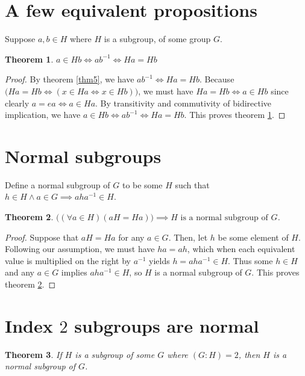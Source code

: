 \documentclass[12pt]{article}
\newtheorem{thm}{Theorem}
\begin{document}
\section{A few equivalent propositions}

Suppose $a,b \in H$
where $H$ is a subgroup,
of some group $G$.

\begin{thm} \label{thm11}
	$a \in Hb \iff ab^{-1} \iff Ha = Hb$
\end{thm}

\begin{proof}
	By theorem \ref{thm5},
	we have $ab^{-1} \iff Ha = Hb$.
	Because $\Big(Ha = Hb \iff (x \in Ha \iff x \in Hb)\Big)$,
	we must have $Ha = Hb \iff a \in Hb$
	since clearly $a = ea \iff a \in Ha$.
	By transitivity and commutivity of bidirective implication,
	we have $a \in Hb \iff ab^{-1} \iff Ha = Hb$.
	This proves theorem \ref{thm11}.
\end{proof}

\section{Normal subgroups}

Define a normal subgroup of $G$ to be some $H$
such that $h \in H \land a \in G \implies aha^{-1} \in H$.

\begin{thm} \label{thm12}
	$\Big((\forall a \in H)(aH = Ha)\Big) \implies H \textrm{ is a normal subgroup of } G$.
\end{thm}

\begin{proof}
	Suppose that $aH = Ha$
	for any $a \in G$.
	Then, let $h$ be some
	element of $H$.
	Following our assumption,
	we must have $ha = ah$,
	which when each equivalent
	value is multiplied
	on the right
	by $a^{-1}$
	yields $h = aha^{-1} \in H$.
	Thus some $h \in H$ and any $a \in G$
	implies $aha^{-1} \in H$,
	so $H$ is a normal subgroup of $G$.
	This proves theorem \ref{thm12}.
\end{proof}

\section{Index $2$ subgroups are normal}

\begin{thm} \label{thm13}
	If $H$ is a subgroup of some $G$ where $(G:H) = 2$,
	then $H$ is a normal subgroup of $G$.
\end{thm}
\end{document}
